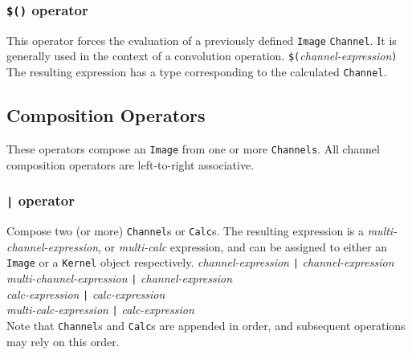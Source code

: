 \subsubsection{\texttt{\$()} operator}
\label{sssec:evalop}
This operator forces the evaluation of a previously defined \texttt{Image}
\texttt{Channel}. It is generally used in the context of a convolution operation.
\startsyn
\texttt{\$(}\emph{channel-expression}\texttt{)}
\stopsyn
The resulting expression has a type corresponding to the
calculated \texttt{Channel}.

\subsection{Composition Operators}
\label{ssec:compositionops}
These operators compose an \texttt{Image} from one or more \texttt{Channels}.
All channel composition operators are left-to-right associative.

\subsubsection{\texttt{|} operator}
\label{sssec:barop}
Compose two (or more) \texttt{Channel}s or \texttt{Calc}s. The resulting expression is a
\emph{multi-channel-expression}, or \emph{multi-calc} expression, and can be assigned
to either an \texttt{Image} or a \texttt{Kernel} object respectively.
\startsyn
\emph{channel-expression} \texttt{|} \emph{channel-expression} \\
\emph{multi-channel-expression} \texttt{|} \emph{channel-expression} \\
\emph{calc-expression} \texttt{|} \emph{calc-expression} \\
\emph{multi-calc-expression} \texttt{|} \emph{calc-expression} \\
\stopsyn
Note that \texttt{Channel}s and \texttt{Calc}s are appended in order, and
subsequent operations may rely on this order.


